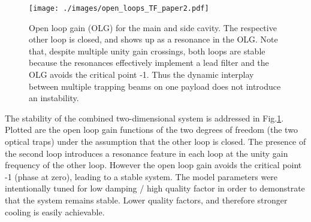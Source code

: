 \documentclass[%
 reprint,
 amsmath,amssymb,
 aps,
]{revtex4-1}
\begin{document}
\begin{figure}[htbp]
	\centering
		\texttt{[image: ./images/open\_loops\_TF\_paper2.pdf]}%
	\caption{{Open loop gain (OLG) for the main and side cavity.	The respective other loop is closed, and shows up as a resonance in the OLG. Note that, despite multiple unity gain crossings, both loops are stable because the resonances effectively implement a lead filter and the OLG avoids the critical point -1. Thus the dynamic interplay between multiple trapping beams on one payload does not introduce an instability.}}
	\label{fig:control_loops}
\end{figure}


The stability of the combined two-dimensional system is addressed in Fig.\ref{fig:control_loops}. Plotted are the open loop gain functions of the two degrees of freedom (the two optical traps) under the assumption that the other loop is closed. The presence of the second loop introduces a resonance feature in each loop at the unity gain frequency of the other loop. However the open loop gain avoids the critical point -1 (phase at zero), leading to a stable system. The model parameters were intentionally tuned for low damping / high quality factor in order to demonstrate that the system remains stable. Lower quality factors, and therefore stronger cooling is easily achievable.

%
\end{document}
